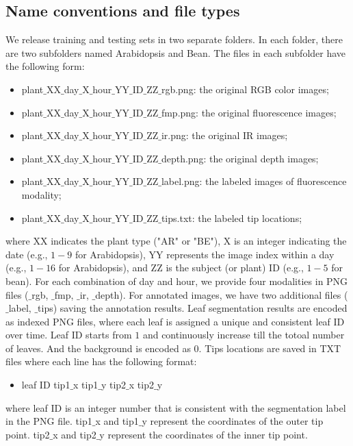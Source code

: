 \subsection{Name conventions and file types}
We release training and testing sets in two separate folders.
In each folder, there are two subfolders named Arabidopsis and Bean.
The files in each subfolder have the following form:
\begin{itemize}
  \item plant$\_$XX$\_$day$\_$X$\_$hour$\_$YY$\_$ID$\_$ZZ$\_$rgb.png: the original RGB color images;
  \item plant$\_$XX$\_$day$\_$X$\_$hour$\_$YY$\_$ID$\_$ZZ$\_$fmp.png: the original fluorescence images;
  \item plant$\_$XX$\_$day$\_$X$\_$hour$\_$YY$\_$ID$\_$ZZ$\_$ir.png: the original IR images;
  \item plant$\_$XX$\_$day$\_$X$\_$hour$\_$YY$\_$ID$\_$ZZ$\_$depth.png: the original depth images;
  \item plant$\_$XX$\_$day$\_$X$\_$hour$\_$YY$\_$ID$\_$ZZ$\_$label.png: the labeled images of fluorescence modality;
  \item plant$\_$XX$\_$day$\_$X$\_$hour$\_$YY$\_$ID$\_$ZZ$\_$tips.txt: the labeled tip locations;
\end{itemize}
where XX indicates the plant type ("AR" or "BE"), X is an integer indicating the date (e.g., $1-9$ for Arabidopsis), YY represents the image index within a day (e.g., $1-16$ for Arabidopsis), and ZZ is the subject (or plant) ID (e.g., $1-5$ for bean). 
For each combination of day and hour, we provide four modalities in PNG files ($\_$rgb, $\_$fmp, $\_$ir, $\_$depth).
For annotated images, we have two additional files ($\_$label, $\_$tips) saving the annotation results.
Leaf segmentation results are encoded as indexed PNG files, where each leaf is assigned a unique and consistent leaf ID over time.
Leaf ID starts from $1$ and continuously increase till the totoal number of leaves.
And the background is encoded as $0$.
Tips locations are saved in TXT files where each line has the following format:
\begin{itemize}
  \item leaf ID \quad tip1$\_$x \quad tip1$\_$y \quad tip2$\_$x \quad  tip2$\_$y
\end{itemize}
where leaf ID is an integer number that is consistent with the segmentation label in the PNG file.
tip1$\_$x and tip1$\_$y represent the coordinates of the outer tip point.
tip2$\_$x and tip2$\_$y represent the coordinates of the inner tip point.



